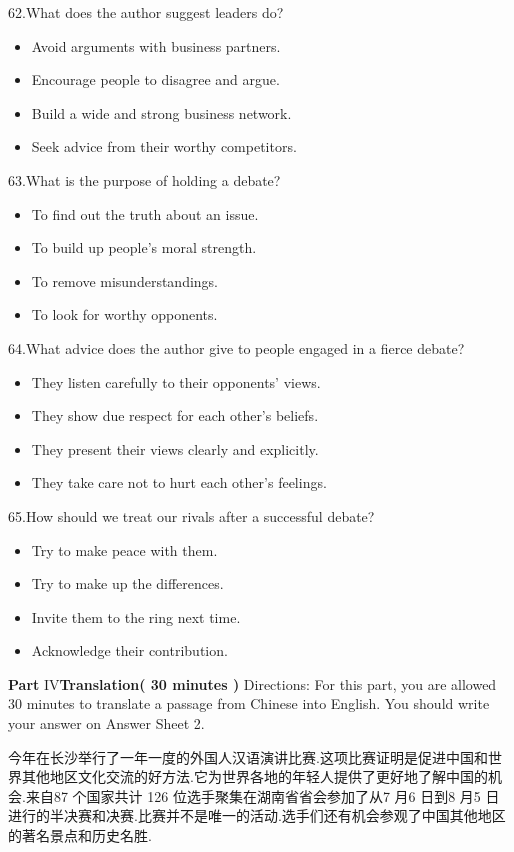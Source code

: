 \documentclass[UTF8,11pt]{ctexart}
\begin{document}
62.What does the author suggest leaders do?


\begin{itemize}[leftmargin=2em,itemsep=.2em,topsep=.4em]\item[A.] Avoid arguments with business partners.
\item[B.] Encourage people to disagree and argue.
\item[C.] Build a wide and strong business network.
\item[D.] Seek advice from their worthy competitors.
\end{itemize}

63.What is the purpose of holding a debate?


\begin{itemize}[leftmargin=2em,itemsep=.2em,topsep=.4em]\item[A.] To find out the truth about an issue.
\item[B.] To build up people's moral strength.
\item[C.] To remove misunderstandings.
\item[D.] To look for worthy opponents.
\end{itemize}

64.What advice does the author give to people engaged in a fierce debate?


\begin{itemize}[leftmargin=2em,itemsep=.2em,topsep=.4em]\item[A.] They listen carefully to their opponents' views.
\item[B.] They show due respect for each other's beliefs.
\item[C.] They present their views clearly and explicitly.
\item[D.] They take care not to hurt each other's feelings.
\end{itemize}

65.How should we treat our rivals after a successful debate?


\begin{itemize}[leftmargin=2em,itemsep=.2em,topsep=.4em]\item[A.] Try to make peace with them.
\item[B.] Try to make up the differences.
\item[C.] Invite them to the ring next time.
\item[D.] Acknowledge their contribution.
\end{itemize}

\textbf{Part} IV\textbf{Translation( 30 minutes )} Directions: For this part, you are allowed 30 minutes to translate a passage from Chinese into English. You should write your answer on Answer Sheet 2.


今年在长沙举行了一年一度的外国人汉语演讲比赛.这项比赛证明是促进中国和世界其他地区文化交流的好方法.它为世界各地的年轻人提供了更好地了解中国的机会.来自87 个国家共计 126 位选手聚集在湖南省省会参加了从7 月6 日到8 月5 日进行的半决赛和决赛.比赛并不是唯一的活动.选手们还有机会参观了中国其他地区的著名景点和历史名胜.
\end{document}
